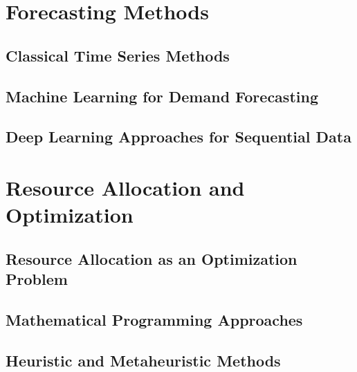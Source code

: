 \section{Forecasting Methods}
\label{sec:forecasting}

\subsection{Classical Time Series Methods}

\subsection{Machine Learning for Demand Forecasting}

\subsection{Deep Learning Approaches for Sequential Data}

\section{Resource Allocation and Optimization}
\label{sec:optimization}

\subsection{Resource Allocation as an Optimization Problem}

\subsection{Mathematical Programming Approaches}

\subsection{Heuristic and Metaheuristic Methods}

